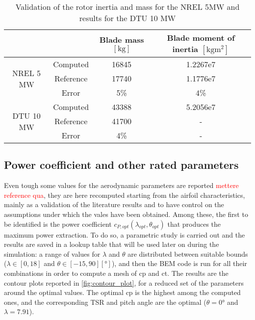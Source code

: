 \begin{table}[htb]
 \caption{Validation of the rotor inertia and mass for the NREL 5MW and results for the DTU 10 MW}
\centering
	\begin{tabular}{cccc}
		\toprule
    & & Blade mass $\left[\si{\kilo\gram}\right]$ & Blade moment of inertia $\left[\si{\kilo\gram\square\meter}\right]$\\ \midrule
    \multirow{3}{*}{NREL 5 MW}		     &  Computed 	& 16845	&  1.2267e7\\
      & Reference	\cite{NREL_5MW_reference} & 17740 &  1.1776e7\\ 
      & Error & 5\% &4\% \\ \midrule
    \multirow{3}{*}{DTU 10 MW}& Computed    &  43388 & 5.2056e7\\
& Reference \cite{review_of_scaling_low} & 41700 & -\\
& Error & 4\% & -  \\  
		\bottomrule
	\end{tabular}
 \label{tab:rotor_inertia}
\end{table}

\subsection{Power coefficient and other rated parameters}\label{subsec:lookup_cp}
Even tough some values for the aerodynamic parameters are reported \textcolor{red}{mettere reference qua}, they are here recomputed starting from the airfoil characteristics, mainly as a validation of the literature results and to have control on the assumptions under which the vales have been obtained. Among these, the first to be identified is the power coefficient $c_{P, opt}(\lambda_{opt}, \theta_{opt})$ that produces the maximum power extraction. To do so, a parametric study is carried out and the results are saved in a lookup table that will be used later on during the simulation: a range of values for $\lambda$ and $\theta$ are distributed between suitable bounds ($\lambda \in \left[0, 18\right]$  and $\theta \in \left[-15, 90\right] \left[\si{\degree}\right]$), and then the \acrshort{BEM} code is run for all their combinations in order to compute a mesh of \acrshort{cp} and \acrshort{ct}. The results are the contour plots reported in \autoref{fig:contour_plot}, for a reduced set of the parameters around the optimal values. The optimal \acrlong{cp} is the highest among the computed ones, and the corresponding \acrshort{TSR} and pitch angle are the optimal ($\theta=0\si{\degree}$ and $\lambda=7.91$). 


